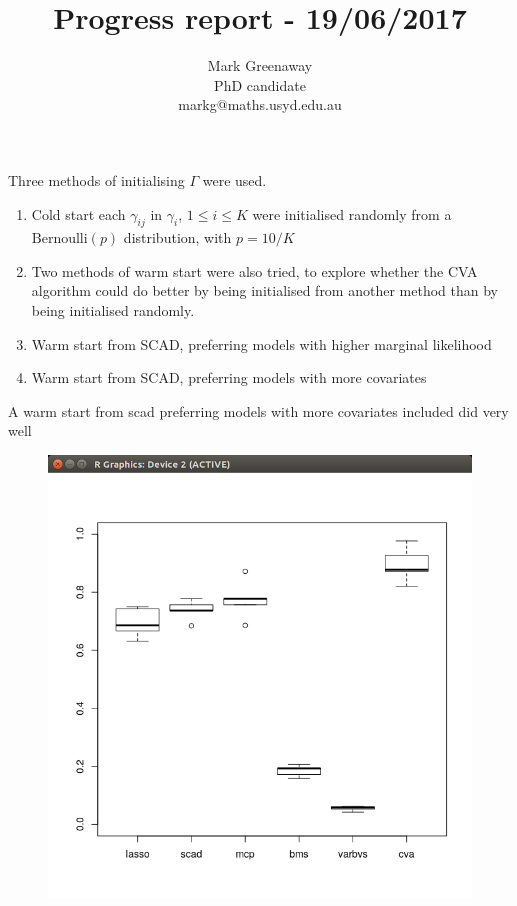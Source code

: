 \documentclass{beamer}
\title{Progress report - 19/06/2017}
\author{Mark Greenaway\\PhD candidate\\markg@maths.usyd.edu.au}
\begin{document}
\begin{frame}
\maketitle
\end{frame}

\begin{frame}
Three methods of initialising $\Gamma$ were used.
\begin{enumerate}
\item Cold start each $\gamma_{ij}$ in $\gamma_i$, $1 \leq i \leq K$ were initialised randomly from a
$\text{Bernoulli}(p)$ distribution, with $p = 10 / K$
\item Two methods of warm start were also tried, to explore whether the CVA algorithm could do better by being
initialised from another method than by being initialised randomly. 
\item Warm start from SCAD, preferring models with higher marginal likelihood
\item Warm start from SCAD, preferring models with more covariates
\end{enumerate}
\end{frame}

\begin{frame}{A warm start from scad preferring models with more covariates included did very well}

\begin{figure}
\includegraphics[scale=0.33]{QLT_warm_start_covariates.png}
\end{figure}
\end{frame}
\end{document}
